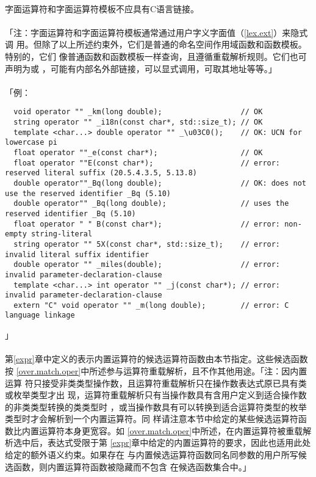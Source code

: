 \paragraph{}
字面运算符和字面运算符模板不应具有C语言链接。

\paragraph{}
「注：字面运算符和字面运算符模板通常通过用户字义字面值（\ref{lex.ext}）来隐式调
用。但除了以上所述约束外，它们是普通的命名空间作用域函数和函数模板。特别的，它们
像普通函数和函数模板一样查询，且遵循重载解析规则。它们也可声明为或
，可能有内部名外部链接，可以显式调用，可取其地址等等。」

\paragraph{}
「例：
\begin{lstlisting}
  void operator "" _km(long double);                  // OK
  string operator "" _i18n(const char*, std::size_t); // OK
  template <char...> double operator "" _\u03C0();    // OK: UCN for lowercase pi
  float operator ""_e(const char*);                   // OK
  float operator ""E(const char*);                    // error: reserved literal suffix (20.5.4.3.5, 5.13.8)
  double operator""_Bq(long double);                  // OK: does not use the reserved identifier _Bq (5.10)
  double operator"" _Bq(long double);                 // uses the reserved identifier _Bq (5.10)
  float operator " " B(const char*);                  // error: non-empty string-literal
  string operator "" 5X(const char*, std::size_t);    // error: invalid literal suffix identifier
  double operator "" _miles(double);                  // error: invalid parameter-declaration-clause
  template <char...> int operator "" _j(const char*); // error: invalid parameter-declaration-clause
  extern "C" void operator "" _m(long double);        // error: C language linkage
\end{lstlisting}」

\paragraph{}
第\ref{expr}章中定义的表示内置运算符的候选运算符函数由本节指定。这些候选函数按
\ref{over.match.oper}中所述参与运算符重载解析，且不作其他用途。「注：因内置运算
符只接受非类类型操作数，且运算符重载解析只在操作数表达式原已具有类或枚举类型才出
现，运算符重载解析只有当操作数具有含用户定义到适合操作数的非类类型转换的类类型时
，或当操作数具有可以转换到适合运算符类型的枚举类型时才会解析到一个内置运算符。同
样请注意本节中给定的某些候选运算符函数比内置运算符本身更宽容。如
\ref{over.match.oper}中所述，在内置运算符被重载解析选中后，表达式受限于第
\ref{expr}章中给定的内置运算符的要求，因此也适用此处给定的额外语义约束。如果存在
与内置候选运算符函数同名同参数的用户所写候选函数，则内置运算符函数被隐藏而不包含
在候选函数集合中。」

